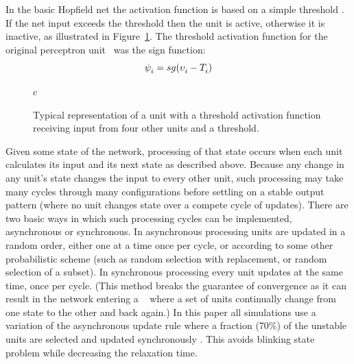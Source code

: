 In the basic Hopfield net the activation function \activationFunction{} is based on a simple threshold \unitThreshold{}{}.  If the net input exceeds the threshold then the unit is active, otherwise it is inactive, as illustrated in Figure~\ref{fig:unitDiagram}.  The threshold activation function for the original perceptron unit~\citep{Rosenblatt1958} was the sign function: \begin{equation}
    \label{eq:signFunction}
        \psi_{i}^{} = sg(\upsilon_{i}^{}-T_{i}^{})
\end{equation}
\begin{figure}
  \begin{center}
%        
\begin{tabular}{c}
\end{tabular}        
        \caption{Typical representation of a unit with a threshold activation function receiving input from four other units and a threshold.}
        \label{fig:unitDiagram}
  \end{center}
\end{figure}

Given some state of the network, processing of that state occurs when each unit calculates its input and its next state as described above.   Because any change in any unit's state changes the input to every other unit, such processing may take many cycles through many configurations before settling on a stable output pattern (where no unit changes state over a compete cycle of updates).  There are two basic ways in which such processing cycles can be implemented, asynchronous or synchronous.  In asynchronous processing units are updated in a random order, either one at a time once per cycle, or according to some other probabilistic scheme (such as random selection with replacement, or random selection of a subset). In synchronous processing every unit updates at the same time, once per cycle.  (This method breaks the guarantee of convergence as it can result in the network entering a ~\citep{vanHemmen1997} where a set of units continually change from one state to the other and back again.)  In this paper all simulations use a variation of the asynchronous  update rule where a fraction (70\%) of the unstable units are selected and updated synchronously . This avoids blinking state problem while decreasing the relaxation time. 

